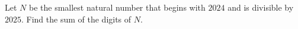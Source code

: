 Let $N$ be the smallest natural number that begins with $2024$ and is divisible by $2025$. Find the sum of the digits of $N$.
